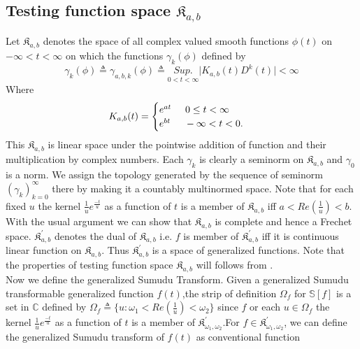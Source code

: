 \subsection{Testing function space $\mathfrak{K}_{a,b}$}
 Let $\mathfrak{K}_{a,b}$ denotes the space of all complex valued smooth functions $\phi(t)$ on $-\infty<t<\infty$ on which the functions $\gamma_{k}(\phi)$ defined by\\
 \begin{equation}
 \gamma_{k}(\phi)\triangleq \gamma_{a,b,k}(\phi)\triangleq \underset{0<t<\infty}{Sup.}\vert K_{a,b}(t)D^{k}(t)\vert <\infty
 \end{equation}
 Where \begin{align*}
  K_{a,b}(t) = \begin{cases}
  e^{at}\hspace{0.5cm}  0\leq t<\infty \\
  e^{bt}\hspace{0.5cm}  -\infty<t<0.
  \end{cases}
 \end{align*}
This $\mathfrak{K}_{a,b}$ is linear space under the pointwise addition of function and their multiplication by complex numbers. Each $\gamma_{k}$ is clearly a seminorm on $\mathfrak{K}_{a,b}$ and $\gamma_{0}$ is a norm. We assign the topology generated by the sequence of seminorm ${(\gamma_{k})}_{k=0}^{\infty}$ there by making it a countably multinormed space. Note that for each fixed $u$ the kernel $\frac{1}{u}e^{\frac{-t}{u}}$ as a function of $t$ is a member of $\mathfrak{K}_{a,b}$ iff $a<Re(\frac{1}{u})<b$. With the usual argument we can show that $\mathfrak{K}_{a,b}$ is complete and hence a Frechet space. $\mathfrak{K}_{a,b}^{'}$ denotes the dual of $\mathfrak{K}_{a,b}$ i.e. $f$ is member of $\mathfrak{K}_{a,b}^{'}$ iff it is continuous linear function on $\mathfrak{K}_{a,b}$. Thus $\mathfrak{K}_{a,b}^{'}$ is a space of generalized functions. Note that the properties of testing function space $\mathfrak{K}_{a,b}$ will follows from \cite{R98}.\\
Now we define the generalized Sumudu Transform. Given a generalized Sumudu transformable generalized function $f(t)$,the strip of definition $\Omega_{f}$ for $\mathbb{S}[f]$ is a set in $\mathbb{C}$ defined by $\Omega_{f}\triangleq\lbrace u:\omega_{1}<Re(\frac{1}{u})<\omega_{2}\rbrace$ since $f$ or each $ u\in\Omega_{f}$ the kernel $\frac{1}{u}e^{\frac{-t}{u}}$ as a function of $t$ is a member of $\mathfrak{K}_{\omega_{1},\omega_{2}}^{'}$.For $f\in \mathfrak{K}_{\omega_{1},\omega_{2}}^{'}$, we can define the generalized Sumudu transform of $f(t)$ as conventional function
